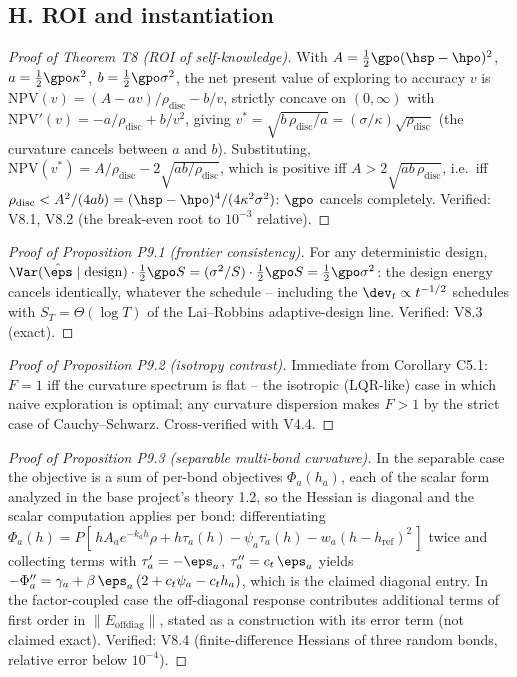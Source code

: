 \subsection*{H. ROI and instantiation}

\begin{proof}[Proof of Theorem T8 (ROI of self-knowledge)]
With $A = \tfrac{1}{2}\gpo(\hsp - \hpo)^2$, $a = \tfrac{1}{2}\gpo\kappa^2$,
$b = \tfrac{1}{2}\gpo\sigma^2$, the net present value of exploring to
accuracy $v$ is $\mathrm{NPV}(v) = (A - a v)/\rho_{\mathrm{disc}} - b/v$,
strictly concave on $(0,\infty)$ with
$\mathrm{NPV}'(v) = -a/\rho_{\mathrm{disc}} + b/v^2$, giving
$v^* = \sqrt{b\,\rho_{\mathrm{disc}}/a} =
(\sigma/\kappa)\sqrt{\rho_{\mathrm{disc}}}$ (the curvature cancels between
$a$ and $b$). Substituting, $\mathrm{NPV}(v^*) = A/\rho_{\mathrm{disc}} -
2\sqrt{ab/\rho_{\mathrm{disc}}}$, which is positive iff
$A > 2\sqrt{a b\,\rho_{\mathrm{disc}}}$, i.e.\ iff
$\rho_{\mathrm{disc}} < A^2/(4ab) = (\hsp - \hpo)^4/(4\kappa^2\sigma^2)$:
$\gpo$ cancels completely. Verified: V8.1, V8.2 (the break-even root to
$10^{-3}$ relative).
\end{proof}

\begin{proof}[Proof of Proposition P9.1 (frontier consistency)]
For any deterministic design, $\Var(\hat\eps\mid\mathrm{design}) \cdot
\tfrac{1}{2}\gpo S = (\sigma^2/S)\cdot\tfrac{1}{2}\gpo S =
\tfrac{1}{2}\gpo\sigma^2$: the design energy cancels identically, whatever
the schedule -- including the $\dev_t \propto t^{-1/2}$ schedules with
$S_T = \Theta(\log T)$ of the Lai--Robbins adaptive-design line. Verified:
V8.3 (exact).
\end{proof}

\begin{proof}[Proof of Proposition P9.2 (isotropy contrast)]
Immediate from Corollary C5.1: $F = 1$ iff the curvature spectrum is flat
-- the isotropic (LQR-like) case in which naive exploration is optimal;
any curvature dispersion makes $F > 1$ by the strict case of
Cauchy--Schwarz. Cross-verified with V4.4.
\end{proof}

\begin{proof}[Proof of Proposition P9.3 (separable multi-bond curvature)]
In the separable case the objective is a sum of per-bond objectives
$\Phi_a(h_a)$, each of the scalar form analyzed in the base project's
theory 1.2, so the Hessian is diagonal and the scalar computation applies
per bond: differentiating $\Phi_a(h) = P[\,h A_a e^{-k_a h}\rho + h
\tau_a(h) - \psi_a \tau_a(h) - w_a (h - h_{\mathrm{ref}})^2\,]$ twice and
collecting terms with $\tau_a' = -\eps_a$, $\tau_a'' = c_t\,\eps_a$ yields
$-\Phi_a'' = \gamma_a + \beta\,\eps_a\,(2 + c_t\psi_a - c_t h_a)$, which is
the claimed diagonal entry. In the factor-coupled case the off-diagonal
response contributes additional terms of first order in
$\|E_{\mathrm{offdiag}}\|$, stated as a construction with its error term
(not claimed exact). Verified: V8.4 (finite-difference Hessians of three
random bonds, relative error below $10^{-4}$).
\end{proof}

